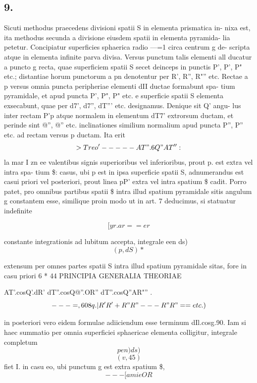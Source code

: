 \documentclass[12pt,a4paper]{article}
\begin{document}
\subsection*{9.}

Sicuti methodus praecedens divisioni spatii S in elementa prismatica in-
nixa est, ita methodus secunda a divisione eiusdem spatii in elementa pyramida-
lia petetur.   Concipiatur superficies sphaerica radio ---=1 circa centrum g de-
scripta atque in elementa infinite parva divisa. Versus punctum talis elementi
all ducatur a puncto g recta, quae superficiem spatii S secet deinceps in punctis
P', P', P" etc.; distantiae horum punctorum a pn denotentur per R', R'', R"'' etc.
Rectae a p versus omnia puncta peripheriae elementi dII ductae formabunt spa-
tium pyramidale, et apud puncta           P', P", P" etc. e superficie spatii S elementa
exsecabunt,     quae per     d7', d7'', dT''' etc.          designamus.   Denique sit    Q'   angu-
lus inter rectam        P'p atque normalem in elementum dT7' extrorsum ductam, et
perinde sint @'', @'' etc. inclinationes similium normalium apud puncta P'', P'' etc.
ad rectam versus        p ductam.   Ita erit
\[                    >       Treo'    --   --- AT".6Q"                AT'':\]
la                               mar               I zn         ee
valentibus signis superioribus vel inferioribus, prout p. est extra vel intra spa-
tium \$: casus, ubi p est in ipsa superficie spatii S, adnumerandus est casui
priori vel posteriori, prout linea pP' extra vel intra spatium \$ cadit.
Porro patet, pro omnibus partibus spatii \$ intra illud spatium pyramidale
sitis angulum g constantem esse, similique proin modo ut in art. 7 deducimus,
si statuatur indefinite

\[                                     [yr.ar == er\]

constante integrationis ad lubitum accepta, integrale
een                   ds)
\[                                               (p, dS)*\]

extensum per omnes partes spatii S intra illud spatium pyramidale sitas, fore in
casu priori
6 *
44                                   PRINCIPIA GENERALIA THEORIAE

AT'.cosQ'.dR'           dT''.cosQ@''.OR''       dT''.cosQ''AR"''            .
\[            ---=,   608 q . |   R'R'           +       R"R"         ---       R"R"        ==   etc.)\]



in posteriori vero eidem formulae adiiciendum esse terminum dIl.cosg.90.
Iam si haec summatio per omnia superficiei sphaericae elementa colligitur,
integrale completum
\[                                             pen)              ds)\]
\[                                                     (v, 45)\]
fiet
I.     in casu eo, ubi punctum g est extra spatium \$,
\[                                         ---       [    a mie OR\]
\end{document}
